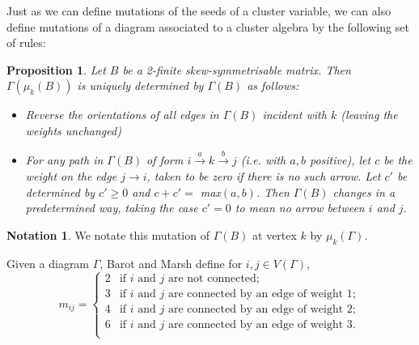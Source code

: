 \documentclass[11pt]{amsart}
\newtheorem{prop}[thm]{Proposition}
\theoremstyle{definition}
\newtheorem{note}[thm]{Notation}
\newcommand\V{V(\Gamma)}
\begin{document}
Just as we can define mutations of the seeds of a cluster variable, we can also define mutations of a diagram associated to a cluster algebra by the following set of rules:
\begin{prop}\cite[Proposition 1.4]{BM13}
Let $B$ be a 2-finite skew-symmetrisable matrix. Then $\Gamma(\mu_k(B))$ is uniquely determined by $\Gamma(B)$ as follows: 
\begin{itemize}
\item Reverse the orientations of all edges in $\Gamma(B)$ incident with $k$ (leaving the weights unchanged)
\item For any path in $\Gamma(B)$ of form $i \xrightarrow{a} k \xrightarrow{b} j$ (i.e. with $a,b$ positive), let $c$ be the weight on the edge $j \rightarrow i$, taken to be zero if there is no such arrow. Let $c'$ be determined by $c'\geq 0$ and 
$c+c' =$ max$(a,b)$. 
Then $\Gamma(B)$ changes in a predetermined way,  taking the case $c' = 0$ to mean no arrow between $i$ and $j$.
\end{itemize}
\end{prop}

\begin{note}
We notate this mutation of $\Gamma(B)$ at vertex $k$ by $\mu_k(\Gamma)$. \\
\end{note}


\indent Given a diagram $\Gamma$, Barot and Marsh define for $i, j \in \V$,
\begin{displaymath}
m_{ij} = \begin{cases}    2 & \mbox{if } i \mbox{ and } j \mbox{ are not connected;} \\
																	3 & \mbox{if } i \mbox{ and } j \mbox{ are connected by an edge of weight } 1;\\
																	4 & \mbox{if } i \mbox{ and } j \mbox{ are connected by an edge of weight } 2;\\
																	6 & \mbox{if } i \mbox{ and } j \mbox{ are connected by an edge of weight } 3.\\
					\end{cases}
\end{displaymath}	
\end{document}
